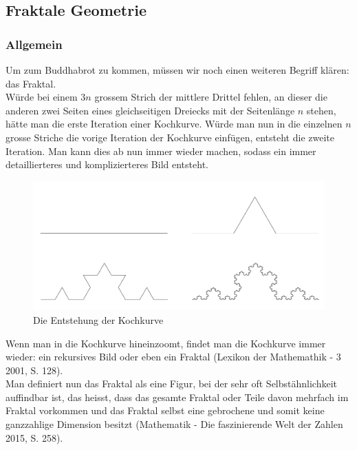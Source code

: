 \subsection{Fraktale Geometrie}
\subsubsection{Allgemein}
Um zum Buddhabrot zu kommen, müssen wir noch einen weiteren Begriff klären: das Fraktal.\\ Würde bei einem 3$n$ grossem Strich der mittlere Drittel fehlen, an dieser die anderen zwei Seiten eines gleichseitigen Dreiecks mit der Seitenlänge $n$ stehen, hätte man die erste Iteration einer Kochkurve. Würde man nun in die einzelnen $n$ grosse Striche die vorige Iteration der Kochkurve einfügen, entsteht die zweite Iteration. Man kann dies ab nun immer wieder machen, sodass ein immer detaillierteres und komplizierteres Bild entsteht.\\

\begin{figure}[h]
    \centering
    \includegraphics[width=.5\textwidth]{Pictures/Kochkurve.png}
    \caption{Die Entstehung der Kochkurve}
    \label{fig:Kochkurve}
\end{figure}
Wenn man in die Kochkurve hineinzoomt, findet man die Kochkurve immer wieder: ein rekursives Bild oder eben ein Fraktal (Lexikon der Mathemathik - 3 2001, S. 128).\\Man definiert nun das Fraktal als eine Figur, bei der sehr oft Selbstähnlichkeit auffindbar ist, das heisst, dass das gesamte Fraktal oder Teile davon mehrfach im Fraktal vorkommen und das Fraktal selbst eine gebrochene und somit keine ganzzahlige Dimension besitzt (Mathematik - Die faszinierende Welt der Zahlen 2015, S. 258).\\


